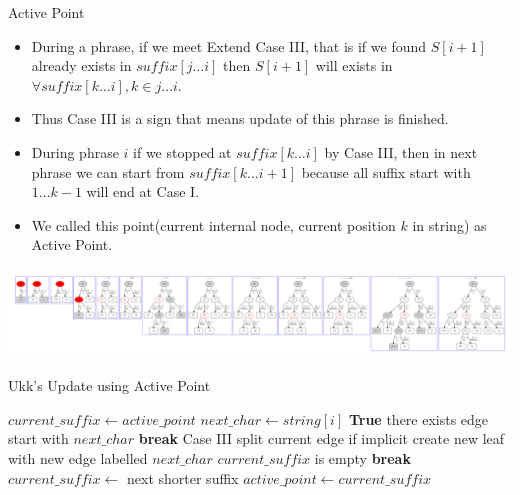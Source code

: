 \begin{frame}{Active Point}
\begin{itemize}
\item During a phrase, if we meet Extend Case III, that is if we found 
$S[i+1]$ already exists in $suffix[j \ldots i]$ then $S[i+1]$ will exists
 in $\forall suffix[k \ldots i], k \in j \ldots i $.
\item Thus Case III is a sign that means update of this phrase is finished.

\item During phrase $i$ if we stopped at $suffix[k \ldots i]$ by Case III,
 then in next phrase we can start from $suffix[k \ldots i+1]$ because all suffix
start with $1 \ldots k-1$ will end at Case I.

\item We called this point(current internal node, current position $k$ in string) as \alert{Active Point}.
\end{itemize}
\includegraphics[width=\textwidth,trim=50pt 50pt 50pt 40pt]{abaababaabaab.pdf}
\end{frame}

\begin{frame}{Ukk's Update using Active Point}
\begin{codebox}
\li $current\_suffix \gets active\_point$
\li $next\_char \gets string[i] $
\li \While \textbf{True}
\li  \Do 
       \If there exists edge start with $next\_char$
\li          \Then \textbf{break} \qquad \Comment Case III
\li          \Else
\li               split current edge if implicit
\li               create new leaf with new edge labelled $next\_char$
             \End
\li   \If $current\_suffix$ is empty
\li   \Then  \textbf{break}
\li   \Else  $current\_suffix \gets$ \alert{next shorter suffix}
      \End
    \End
\li $active\_point \gets current\_suffix$
\end{codebox}

\end{frame}


